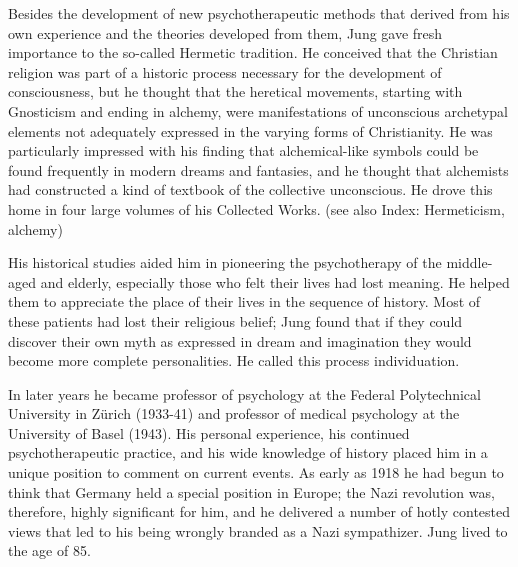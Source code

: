 \documentclass[12pt]{article}
\begin{document}
                                      Besides the development of new psychotherapeutic methods that
                                      derived from his own experience and the theories developed from
                                      them, Jung gave fresh importance to the so-called Hermetic tradition.
                                      He conceived that the Christian religion was part of a historic
                                      process necessary for the development of consciousness, but he
                                      thought that the heretical movements, starting with Gnosticism and
                                      ending in alchemy, were manifestations of unconscious archetypal
                                      elements not adequately expressed in the varying forms of
                                      Christianity. He was particularly impressed with his finding that
                                      alchemical-like symbols could be found frequently in modern dreams
                                      and fantasies, and he thought that alchemists had constructed a kind
                                      of textbook of the collective unconscious. He drove this home in four
                                      large volumes of his Collected Works. (see also Index: Hermeticism,
                                      alchemy) 




                                      His historical studies aided him in pioneering the psychotherapy of
                                      the middle-aged and elderly, especially those who felt their lives had
                                      lost meaning. He helped them to appreciate the place of their lives in
                                      the sequence of history. Most of these patients had lost their
                                      religious belief; Jung found that if they could discover their own myth
                                      as expressed in dream and imagination they would become more
                                      complete personalities. He called this process individuation. 


                                      In later years he became professor of psychology at the Federal
                                      Polytechnical University in Z\"{u}rich (1933-41) and professor of
                                      medical psychology at the University of Basel (1943). His personal
                                      experience, his continued psychotherapeutic practice, and his wide
                                      knowledge of history placed him in a unique position to comment on
                                      current events. As early as 1918 he had begun to think that Germany
                                      held a special position in Europe; the Nazi revolution was, therefore,
                                      highly significant for him, and he delivered a number of hotly
                                      contested views that led to his being wrongly branded as a Nazi
                                      sympathizer. Jung lived to the age of 85. 
\end{document}
